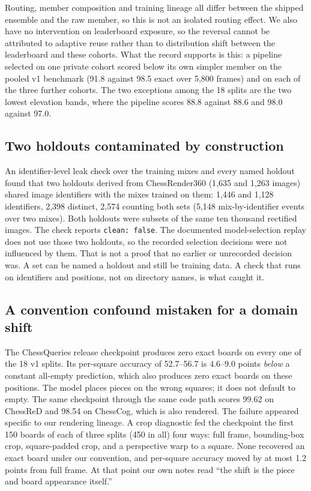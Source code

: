Routing, member composition and training lineage all differ between the shipped ensemble and the
raw member, so this is not an isolated routing effect. We also have no intervention on leaderboard
exposure, so the reversal cannot be attributed to adaptive reuse rather than to distribution shift
between the leaderboard and these cohorts. What the record supports is this: a pipeline selected
on one private cohort scored below its own simpler member on the pooled v1 benchmark (91.8 against
98.5 exact over 5{,}800 frames) and on each of the three further cohorts. The two exceptions among
the 18 splits are the two lowest elevation bands, where the pipeline scores 88.8 against 88.6 and
98.0 against 97.0.

\subsection{Two holdouts contaminated by construction}
\label{sec:contamination}

An identifier-level leak check over the training mixes and every named holdout found that two
holdouts derived from ChessRender360 (1{,}635 and 1{,}263 images) shared image identifiers with
the mixes trained on them: 1{,}446 and 1{,}128 identifiers, 2{,}398 distinct, 2{,}574 counting both
sets (5{,}148 mix-by-identifier events over two mixes). Both holdouts were subsets of the same ten
thousand rectified images. The check reports
\texttt{clean: false}. The documented model-selection replay does not use those two holdouts, so
the recorded selection decisions were not influenced by them. That is not a proof that no earlier
or unrecorded decision was. A set can be named a holdout and still be training data. A check that
runs on identifiers and positions, not on directory names, is what caught it.

\subsection{A convention confound mistaken for a domain shift}
\label{sec:parity}

The ChessQueries release checkpoint produces zero exact boards on every one of the 18 v1 splits.
Its per-square accuracy of 52.7--56.7 is 4.6--9.0 points \emph{below} a constant all-empty
prediction, which also produces zero exact boards on these positions. The model places pieces on
the wrong squares; it does not default to empty. The same checkpoint through the same code path
scores 99.62 on ChessReD and 98.54 on ChessCog, which is also rendered. The failure appeared specific to
our rendering lineage. A crop diagnostic fed the checkpoint the first 150 boards of each of three
splits (450 in all) four ways: full frame, bounding-box crop, square-padded crop, and a perspective
warp to a square. None recovered an exact board under our convention, and per-square accuracy
moved by at most 1.2 points from full frame. At that point our own notes read ``the shift is the
piece and board appearance itself.''

